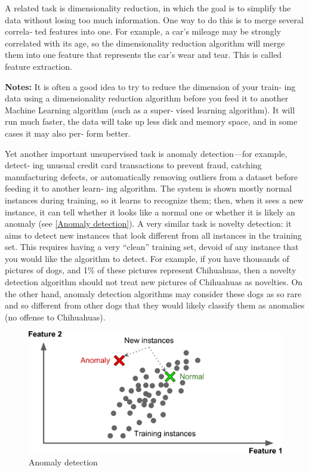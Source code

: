 A related task is dimensionality reduction, in which the goal is to simplify the data
without losing too much information. One way to do this is to merge several correla‐
ted features into one. For example, a car’s mileage may be strongly correlated with its
age, so the dimensionality reduction algorithm will merge them into one feature that
represents the car’s wear and tear. This is called feature extraction.

\textbf{Notes:} It is often a good idea to try to reduce the dimension of your train‐
ing data using a dimensionality reduction algorithm before you
feed it to another Machine Learning algorithm (such as a super‐
vised learning algorithm). It will run much faster, the data will take
up less disk and memory space, and in some cases it may also per‐
form better.

Yet another important unsupervised task is anomaly detection—for example, detect‐
ing unusual credit card transactions to prevent fraud, catching manufacturing defects,
or automatically removing outliers from a dataset before feeding it to another learn‐
ing algorithm. The system is shown mostly normal instances during training, so it
learns to recognize them; then, when it sees a new instance, it can tell whether it looks
like a normal one or whether it is likely an anomaly (see \autoref{Anomaly detection}). A very similar
task is novelty detection: it aims to detect new instances that look different from all
instances in the training set. This requires having a very “clean” training set, devoid of
any instance that you would like the algorithm to detect. For example, if you have
thousands of pictures of dogs, and 1\% of these pictures represent Chihuahuas, then a
novelty detection algorithm should not treat new pictures of Chihuahuas as novelties.
On the other hand, anomaly detection algorithms may consider these dogs as so rare
and so different from other dogs that they would likely classify them as anomalies (no
offense to Chihuahuas).
\begin{figure}
\centering
\includegraphics{img/Anomaly detection.png}
\caption{Anomaly detection}
\label{Anomaly detection}
\end{figure}

